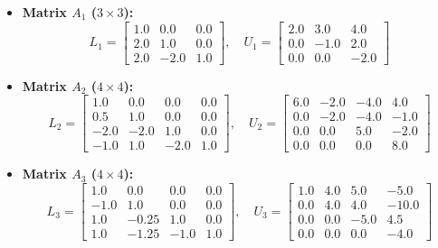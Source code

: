 \begin{solution}
  \begin{itemize}
      \item \textbf{Matrix $A_1$ ($3\times3$):}
      \[
      L_1 = \begin{bmatrix}
        1.0 & 0.0 & 0.0 \\
        2.0 & 1.0 & 0.0 \\
        2.0 & -2.0 & 1.0
      \end{bmatrix}, \quad
        U_1 = \begin{bmatrix}
        2.0 & 3.0 & 4.0 \\
        0.0 & -1.0 & 2.0 \\
        0.0 & 0.0 & -2.0
      \end{bmatrix}
      \]
      \item \textbf{Matrix $A_2$ ($4\times4$):}
      \[
      L_2 = \begin{bmatrix} 
        1.0 & 0.0 & 0.0 & 0.0 \\
        0.5 & 1.0 & 0.0 & 0.0 \\
        -2.0 & -2.0 & 1.0 & 0.0 \\
        -1.0 & 1.0 & -2.0 & 1.0
      \end{bmatrix}, \quad
      U_2 = \begin{bmatrix}
        6.0 & -2.0 & -4.0 & 4.0 \\
        0.0 & -2.0 & -4.0 & -1.0 \\
        0.0 & 0.0 & 5.0 & -2.0 \\
        0.0 & 0.0 & 0.0 & 8.0
      \end{bmatrix}
      \]
      \item \textbf{Matrix $A_3$ ($4\times4$):}
      \[
      L_3 = \begin{bmatrix}
        1.0 & 0.0 & 0.0 & 0.0 \\
        -1.0 & 1.0 & 0.0 & 0.0 \\
        1.0 & -0.25 & 1.0 & 0.0 \\
        1.0 & -1.25 & -1.0 & 1.0
      \end{bmatrix}, \quad
      U_3 = \begin{bmatrix} 
        1.0 & 4.0 & 5.0 & -5.0 \\
        0.0 & 4.0 & 4.0 & -10.0 \\
        0.0 & 0.0 & -5.0 & 4.5 \\
        0.0 & 0.0 & 0.0 & -4.0 
      \end{bmatrix}
      \]
  \end{itemize}


\end{solution}
